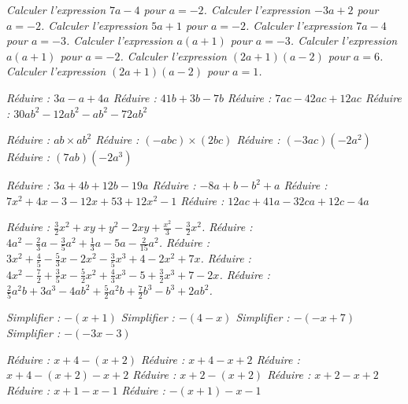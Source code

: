 
\if{} \it Calculer l'expression  $7a - 4$ pour $a= -2$.\fi
\if{} \it Calculer l'expression  $-3a + 2$ pour $a= -2$.\fi
\if{} \it Calculer l'expression  $5a +1 $ pour $a= -2$.\fi
\if{} \it Calculer l'expression  $7a - 4$ pour $a= -3$.\fi
\if{} \it Calculer l'expression  $a(a+1)$ pour $a=-3$.\fi
\if{} \it Calculer l'expression  $a(a+1)$ pour $a=-2$.\fi
\if{} \it Calculer l'expression  $(2a+1)(a-2)$ pour $a=6$.\fi
\if{} \it Calculer l'expression  $(2a+1)(a-2)$ pour $a=1$.\fi

\if{} \it Réduire : $3a-a + 4a$\fi
\if{} \it Réduire : $41b+ 3b - 7b$\fi
\if{} \it Réduire : $7ac - 42ac + 12 ac$\fi
\if{} \it Réduire : $30 ab^2 - 12 ab^2 - ab^2 - 72ab^2$\fi

\if{} \it Réduire : $ab \times ab^2$\fi
\if{} \it Réduire : $(-abc) \times (2bc)$\fi
\if{} \it Réduire : $(-3ac)(-2a^2)$\fi
\if{} \it Réduire : $(7ab)(-2a^3)$\fi


\if{} \it Réduire : $3a + 4b + 12b -19a$\fi
\if{} \it Réduire : $-8a + b - b^2 + a$\fi
\if{} \it Réduire : $7x^2 + 4x - 3 - 12x + 53 + 12x^2 - 1$\fi
\if{} \it Réduire : $12ac + 41a - 32 ca + 12 c - 4 a$\fi 

\if{} \it Réduire : $\frac32 x^2+xy+y^2-2xy+\frac{x^2}3-\frac32x^2$.\fi
\if{} \it Réduire : $4a^2-\frac23a-\frac35a^2+\frac13a-5a-\frac2{15}a^2$.\fi
\if{} \it Réduire : $3x^2+\frac45 - \frac53x - 2x^2 -\frac35x^3 + 4 - 2 x^2 + 7x$. \fi
\if{} \it Réduire : $4x^2 - \frac72 + \frac35x - \frac52x^2 + \frac43 x^3 - 5 + \frac32 x^3 + 7 - 2x$. \fi
\if{} \it Réduire : $\frac25 a^2b + 3a^3 -4ab^2 + \frac52 a^2b + \frac72b^3 - b^3 + 2ab^2$. \fi



  \if{} \it Simplifier : $-(x+1)$ \fi
  \if{} \it Simplifier : $-(4-x)$\fi
  \if{} \it Simplifier : $-(-x+7)$\fi
  \if{} \it Simplifier : $-(-3x-3)$\fi
  
  
  \if{} \it Réduire : $x+4 - (x+2)$\fi
  \if{} \it Réduire : $x+4 - x+2$\fi
  \if{} \it Réduire : $x+4 - (x+2) - x + 2$\fi
  \if{} \it Réduire : $x+2-(x+2)$ \fi
  \if{} \it Réduire : $x+2-x+2$\fi
  \if{} \it Réduire : $x+1 - x - 1 $\fi
  \if{} \it Réduire : $-(x+1) - x - 1$ \fi
  
